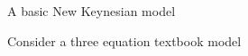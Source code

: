 
\begin{frame}{A basic New Keynesian model}
	\begin{wideitemize}
	    \item Consider a three equation  textbook model \parencite[e.g.][]{Gali2015book,Walsh2010}
%
%
%
	\begin{wideenumerate}
	    \item {}
    	    \begin{equation}

\end{equation}
\end{wideenumerate}
\end{wideitemize}
\end{frame}
